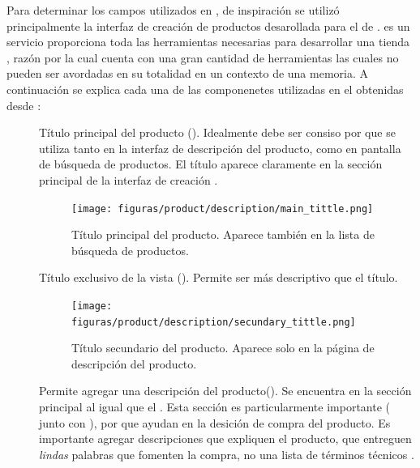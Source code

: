 		Para determinar los campos utilizados en , de inspiración se utilizó principalmente la interfaz de creación de productos desarollada para el \websiteINT de \shopifyNAME {}. \shopifyNAME es un servicio proporciona toda las herramientas necesarias para desarrollar una tienda \online, razón por la cual cuenta con una gran cantidad de herramientas las cuales no pueden ser avordadas en su totalidad en un contexto de una memoria.
		A continuación se explica cada una de las componenetes utilizadas en el \frameworkPC obtenidas desde  \websiteINT \shopifyNAME:

		\begin{description}
			\item [\titleForm]
				Título principal del producto (). Idealmente debe ser consiso por que se utiliza tanto en la interfaz de descripción del producto, como en pantalla de búsqueda de productos. El título aparece claramente en la sección principal de la interfaz de creación .

				\begin{figure}[H]
					\centering
					\texttt{[image: figuras/product/description/main\_tittle.png]}

					\caption{Título principal del producto. Aparece también en la lista de búsqueda de productos.}
					\label{figure:product:description:main_tittle}
				\end{figure}

			\item [\pageTitleForm]
				Título exclusivo de la vista  (). Permite ser más descriptivo que el título. 

				\begin{figure}[H]
					\centering
					\texttt{[image: figuras/product/description/secundary\_tittle.png]}

					\caption{Título secundario del producto. Aparece solo en la página de descripción del producto.}
					\label{figure:product:description:secundary_tittle}
				\end{figure}

			\item [\descriptionForm]
				Permite agregar una descripción del producto(). Se encuentra en la sección principal al igual que el \titleForm {}. Esta sección es particularmente importante ( junto con \multimediaForm), por que ayudan en la desición de compra del producto. Es importante agregar descripciones que expliquen el producto, que entreguen \textit{lindas} palabras que fomenten la compra, no una lista de términos técnicos \cite{online_cxpartners_official_people_see_to_buy}.


\end{description}

